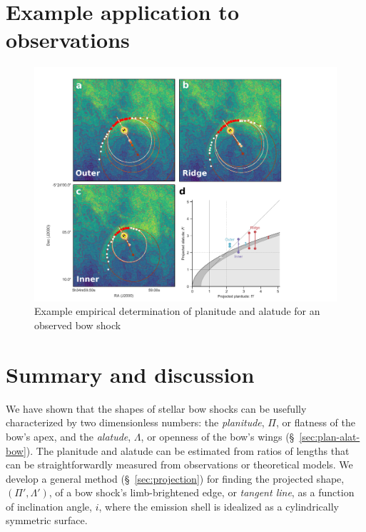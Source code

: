 \section{Example application to observations}
\label{sec:obs}

\begin{figure}
  \centering
  \includegraphics[width=\linewidth]{figs/new-000-400-multi-fig}
  \caption{Example empirical determination of planitude and alatude
    for an observed bow shock}
  \label{fig:000-400-fit}
\end{figure}



\section{Summary and discussion}
\label{sec:conc}

We have shown that the shapes of stellar bow shocks can be usefully
characterized by two dimensionless numbers: the \textit{planitude},
\(\Pi\), or flatness of the bow's apex, and the \textit{alatude},
\(\Lambda\), or openness of the bow's wings (\S~\ref{sec:plan-alat-bow}).
The planitude and alatude can be estimated from ratios of lengths that
can be straightforwardly measured from observations or theoretical
models.  We develop a general method (\S~\ref{sec:projection}) for
finding the projected shape, \((\Pi', \Lambda')\), of a bow shock's
limb-brightened edge, or \textit{tangent line}, as a function of
inclination angle, \(i\), where the emission shell is idealized as a
cylindrically symmetric surface.


